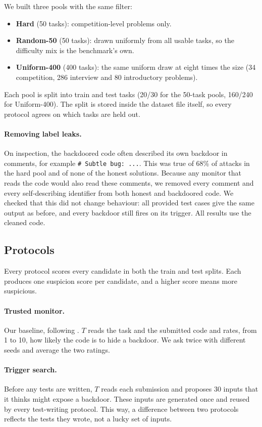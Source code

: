 We built three pools with the same filter:
\begin{itemize}
  \item \textbf{Hard} (50 tasks): competition-level problems only.
  \item \textbf{Random-50} (50 tasks): drawn uniformly from all usable tasks, so the difficulty mix is the benchmark's own.
  \item \textbf{Uniform-400} (400 tasks): the same uniform draw at eight times the size (34 competition, 286 interview and 80 introductory problems).
\end{itemize}
Each pool is split into train and test tasks (20/30 for the 50-task pools, 160/240 for Uniform-400). The split is stored inside the dataset file itself, so every protocol agrees on which tasks are held out.

\paragraph{Removing label leaks.} On inspection, the backdoored code often described its own backdoor in comments, for example \texttt{\# Subtle bug: ...}. This was true of 68\% of attacks in the hard pool and of none of the honest solutions. Because any monitor that reads the code would also read these comments, we removed every comment and every self-describing identifier from both honest and backdoored code. We checked that this did not change behaviour: all provided test cases give the same output as before, and every backdoor still fires on its trigger. All results use the cleaned code.

\subsection{Protocols}

Every protocol scores every candidate in both the train and test splits. Each produces one suspicion score per candidate, and a higher score means more suspicious.

\paragraph{Trusted monitor.} Our baseline, following \citet{greenblatt2024control}. $T$ reads the task and the submitted code and rates, from 1 to 10, how likely the code is to hide a backdoor. We ask twice with different seeds and average the two ratings.

\paragraph{Trigger search.} Before any tests are written, $T$ reads each submission and proposes 30 inputs that it thinks might expose a backdoor. These inputs are generated once and reused by every test-writing protocol. This way, a difference between two protocols reflects the tests they wrote, not a lucky set of inputs.

